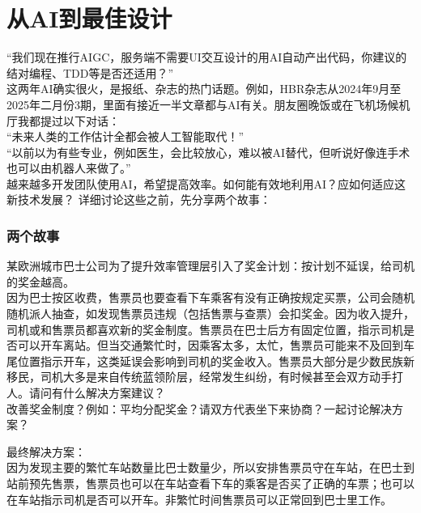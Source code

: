 \chapter{从AI到最佳设计} %


``我们现在推行AIGC，服务端不需要UI交互设计的用AI自动产出代码，你建议的结对编程、TDD等是否还适用？''\\
这两年AI确实很火，是报纸、杂志的热门话题。例如，HBR杂志从2024年9月至2025年二月份3期，里面有接近一半文章都与AI有关。朋友圈晚饭或在飞机场候机厅我都提过以下对话：\\
``未来人类的工作估计全都会被人工智能取代！''\\
``以前以为有些专业，例如医生，会比较放心，难以被AI替代，但听说好像连手术也可以由机器人来做了。''\\
越来越多开发团队使用AI，希望提高效率。如何能有效地利用AI？应如何适应这新技术发展？
详细讨论这些之前，先分享两个故事：\\

\hypertarget{ux4e24ux4e2aux6545ux4e8b}{%
\subsection{两个故事}\label{ux4e24ux4e2aux6545ux4e8b}}

某欧洲城市巴士公司为了提升效率管理层引入了奖金计划：按计划不延误，给司机的奖金越高。\\
因为巴士按区收费，售票员也要查看下车乘客有没有正确按规定买票，公司会随机随机派人抽查，如发现售票员违规（包括售票与查票）会扣奖金。因为收入提升，司机或和售票员都喜欢新的奖金制度。售票员在巴士后方有固定位置，指示司机是否可以开车离站。但当交通繁忙时，因乘客太多，太忙，售票员可能来不及回到车尾位置指示开车，这类延误会影响到司机的奖金收入。售票员大部分是少数民族新移民，司机大多是来自传统蓝领阶层，经常发生纠纷，有时候甚至会双方动手打人。请问有什么解决方案建议？\\
改善奖金制度？例如：平均分配奖金？请双方代表坐下来协商？一起讨论解决方案？

最终解决方案：\\
因为发现主要的繁忙车站数量比巴士数量少，所以安排售票员守在车站，在巴士到站前预先售票，售票员也可以在车站查看下车的乘客是否买了正确的车票；也可以在车站指示司机是否可以开车。非繁忙时间售票员可以正常回到巴士里工作。

\begin{description}
\item[]
\begin{description}
\tightlist
\item[]
-\/-\/-+++-\/-\/-
\end{description}
\end{description}

